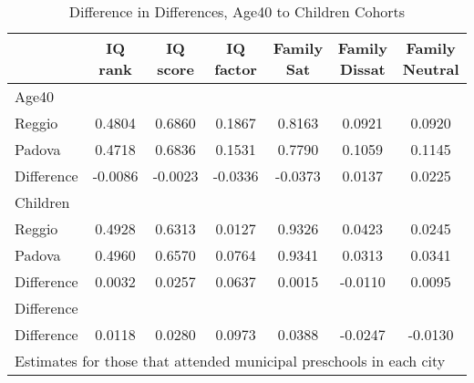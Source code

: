 \begin{table}[htbp]\centering
\caption{Difference in Differences, Age40 to Children Cohorts}
\begin{tabular}{l*{6}{c}}
\hline\hline
            &     IQ rank&    IQ score&   IQ factor&  Family Sat&Family Dissat&Family Neutral\\
\hline
Age40       &            &            &            &            &            &            \\
Reggio      &      0.4804&      0.6860&      0.1867&      0.8163&      0.0921&      0.0920\\
Padova      &      0.4718&      0.6836&      0.1531&      0.7790&      0.1059&      0.1145\\
Difference  &     -0.0086&     -0.0023&     -0.0336&     -0.0373&      0.0137&      0.0225\\
\hline
Children    &            &            &            &            &            &            \\
Reggio      &      0.4928&      0.6313&      0.0127&      0.9326&      0.0423&      0.0245\\
Padova      &      0.4960&      0.6570&      0.0764&      0.9341&      0.0313&      0.0341\\
Difference  &      0.0032&      0.0257&      0.0637&      0.0015&     -0.0110&      0.0095\\
\hline
Difference  &            &            &            &            &            &            \\
Difference  &      0.0118&      0.0280&      0.0973&      0.0388&     -0.0247&     -0.0130\\
\hline\hline
\multicolumn{7}{l}{\footnotesize Estimates for those that attended municipal preschools in each city}\\
\end{tabular}
\end{table}
